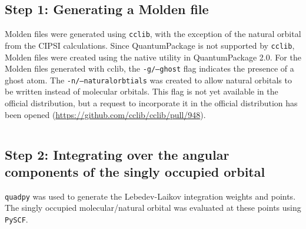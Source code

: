 \subsection{Step 1: Generating a Molden file}
Molden files were generated using \texttt{cclib}, with the exception of the natural orbital from the CIPSI calculations. 
Since QuantumPackage is not supported by \texttt{cclib}, Molden files were created using the native utility in QuantumPackage 2.0. 
For the Molden files generated with cclib, the \texttt{-g/--ghost} flag indicates the presence of a ghost atom.
The \texttt{-n/--naturalorbtials} was created to allow natural orbitals to be written instead of molecular orbitals.
This flag is not yet available in the official distribution, but a request to incorporate it in the official distribution has been opened (\url{https://github.com/cclib/cclib/pull/948}).

%
\inputminted{zsh}{parts/cclibmolden.sh}

\subsection{Step 2: Integrating over the angular components of the singly occupied orbital}

\texttt{quadpy} was used to generate the Lebedev-Laikov integration weights and points.
The singly occupied molecular/natural orbital was evaluated at these points using \texttt{PySCF}.

%
\inputminted{python}{parts/anionradialint.py}


